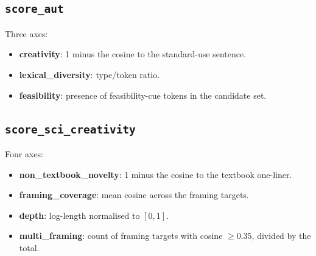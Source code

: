 \subsection{\texttt{score\_aut}}
Three axes:
\begin{itemize}
\item \textbf{creativity}: 1 minus the cosine to the standard-use sentence.
\item \textbf{lexical\_diversity}: type/token ratio.
\item \textbf{feasibility}: presence of feasibility-cue tokens in the candidate set.
\end{itemize}

\subsection{\texttt{score\_sci\_creativity}}
Four axes:
\begin{itemize}
\item \textbf{non\_textbook\_novelty}: 1 minus the cosine to the textbook one-liner.
\item \textbf{framing\_coverage}: mean cosine across the framing targets.
\item \textbf{depth}: log-length normalised to $[0,1]$.
\item \textbf{multi\_framing}: count of framing targets with cosine $\geq 0.35$, divided by the total.
\end{itemize}
